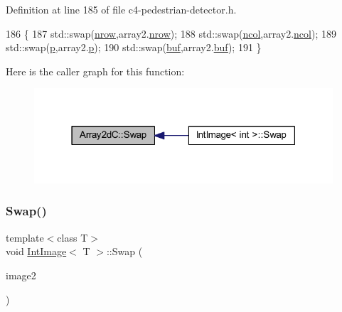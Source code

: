 Definition at line 185 of file c4-\/pedestrian-\/detector.\+h.


\begin{DoxyCode}
186 \{
187     std::swap(\mbox{\hyperlink{class_array2d_c_a12f690f7195f7674a86a7e1eedbc473c}{nrow}},array2.\mbox{\hyperlink{class_array2d_c_a12f690f7195f7674a86a7e1eedbc473c}{nrow}});
188     std::swap(\mbox{\hyperlink{class_array2d_c_a27e0f8f40f644831cd7c750db59dc28a}{ncol}},array2.\mbox{\hyperlink{class_array2d_c_a27e0f8f40f644831cd7c750db59dc28a}{ncol}});
189     std::swap(\mbox{\hyperlink{class_array2d_c_a727eae5d663d463635cc150e6f771f0d}{p}},array2.\mbox{\hyperlink{class_array2d_c_a727eae5d663d463635cc150e6f771f0d}{p}});
190     std::swap(\mbox{\hyperlink{class_array2d_c_a25d8fa5049d4c7ded126e0acdd18f37a}{buf}},array2.\mbox{\hyperlink{class_array2d_c_a25d8fa5049d4c7ded126e0acdd18f37a}{buf}});
191 \}
\end{DoxyCode}
Here is the caller graph for this function\+:
\nopagebreak
\begin{figure}[H]
\begin{center}
\leavevmode
\includegraphics[width=315pt]{class_array2d_c_ae8cbeb3e4fdc3a45cc188ecc1b317919_icgraph}
\end{center}
\end{figure}
\mbox{\label{class_int_image_adc366f59865cefd440c01996fd42d59a}} 
\subsubsection{\texorpdfstring{Swap()}{Swap()}\hspace{0.1cm}{\footnotesize\ttfamily [2/2]}}
{\footnotesize\ttfamily template$<$class T$>$ \\
void \mbox{\hyperlink{class_int_image}{Int\+Image}}$<$ T $>$\+::Swap (\begin{DoxyParamCaption}\item[{\mbox{\hyperlink{class_int_image}{Int\+Image}}$<$ T $>$ \&}]{image2 }\end{DoxyParamCaption})}



